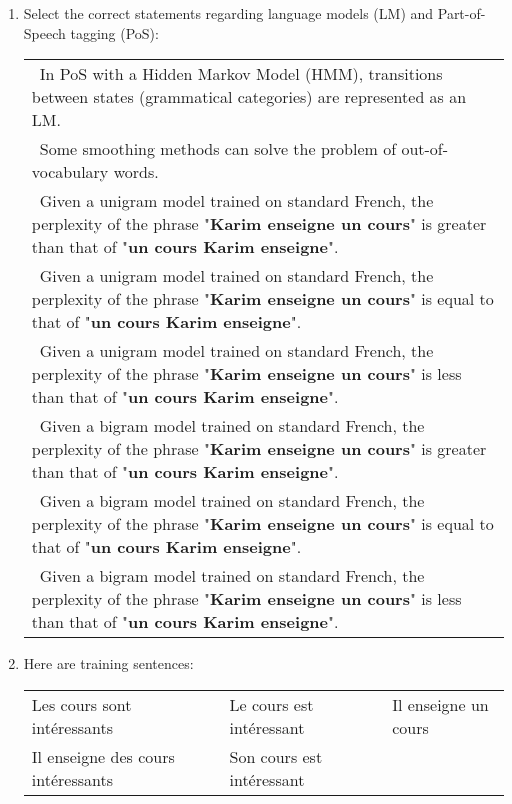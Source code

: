 \documentclass{KBook}
\begin{document}
\begin{enumerate}
	\item Select the correct statements regarding language models (LM) and Part-of-Speech tagging (PoS):
	
	\begin{longtable}{|p{}|}
		\hline 
		\Square\ In PoS with a Hidden Markov Model (HMM), transitions between states (grammatical categories) are represented as an LM. \\
		\Square\ Some smoothing methods can solve the problem of out-of-vocabulary words. \\
		\Square\ Given a unigram model trained on standard French, the perplexity of the phrase "\textbf{Karim enseigne un cours}" is greater than that of "\textbf{un cours Karim enseigne}". \\
		\Square\ Given a unigram model trained on standard French, the perplexity of the phrase "\textbf{Karim enseigne un cours}" is equal to that of "\textbf{un cours Karim enseigne}".\\
		\Square\ Given a unigram model trained on standard French, the perplexity of the phrase "\textbf{Karim enseigne un cours}" is less than that of "\textbf{un cours Karim enseigne}".\\
		\Square\ Given a bigram model trained on standard French, the perplexity of the phrase "\textbf{Karim enseigne un cours}" is greater than that of "\textbf{un cours Karim enseigne}".\\
		\Square\ Given a bigram model trained on standard French, the perplexity of the phrase "\textbf{Karim enseigne un cours}" is equal to that of "\textbf{un cours Karim enseigne}".\\
		\Square\ Given a bigram model trained on standard French, the perplexity of the phrase "\textbf{Karim enseigne un cours}" is less than that of "\textbf{un cours Karim enseigne}".\\
		
		\hline
	\end{longtable}
	
	\item Here are training sentences: 
	
	\begin{tabular}{|lllll|}
		\hline
		Les cours sont intéressants && Le cours est intéressant && Il enseigne un cours \\
		Il enseigne des cours intéressants && Son cours est intéressant &&\\
		\hline
	\end{tabular}
	

\end{enumerate}
\end{document}
